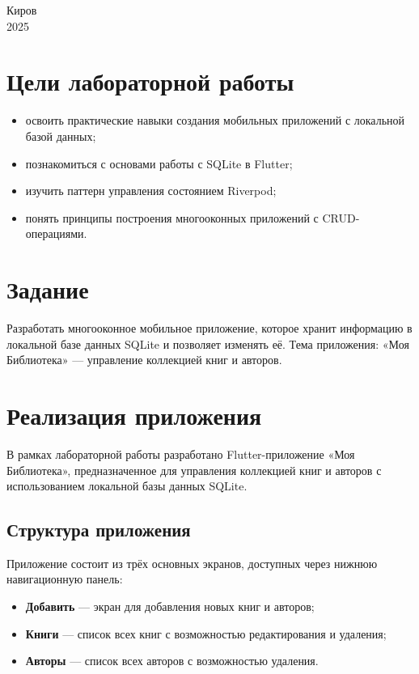 \documentclass[oneside,a4paper,14pt]{extarticle}
\begin{document}
\vfill

\begin{center}
	Киров\\
	2025
\end{center}

\newpage
\thispagestyle{plain}

\section*{Цели лабораторной работы}

\begin{itemize}
	\item[$-$] освоить практические навыки создания мобильных приложений с локальной базой данных;
	\item[$-$] познакомиться с основами работы с SQLite в Flutter;
	\item[$-$] изучить паттерн управления состоянием Riverpod;
	\item[$-$] понять принципы построения многооконных приложений с CRUD-операциями.
\end{itemize}

\section*{Задание}

Разработать многооконное мобильное приложение, которое хранит информацию в локальной базе данных SQLite и позволяет изменять её. Тема приложения: «Моя Библиотека» — управление коллекцией книг и авторов.

\clearpage
\section*{Реализация приложения}

В рамках лабораторной работы разработано Flutter-приложение «Моя Библиотека», предназначенное для управления коллекцией книг и авторов с использованием локальной базы данных SQLite.

\subsection*{Структура приложения}

Приложение состоит из трёх основных экранов, доступных через нижнюю навигационную панель:

\begin{itemize}
	\item[$-$] \textbf{Добавить} — экран для добавления новых книг и авторов;
	\item[$-$] \textbf{Книги} — список всех книг с возможностью редактирования и удаления;
	\item[$-$] \textbf{Авторы} — список всех авторов с возможностью удаления.
\end{itemize}
\end{document}
